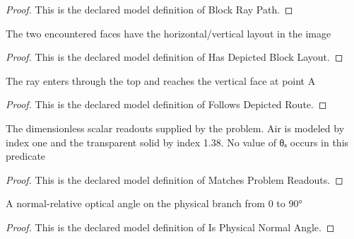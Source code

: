\begin{proof}
  This is the declared model definition of Block Ray Path.
\end{proof}
\begin{definition}
  \label{def:physics:phyx-mini-0096:phyxminiproblems-problemphyxmini0096-hasdepictedblocklayout}
  The two encountered faces have the horizontal/vertical layout in the image
\end{definition}
\begin{proof}
  This is the declared model definition of Has Depicted Block Layout.
\end{proof}
\begin{definition}
  \label{def:physics:phyx-mini-0096:phyxminiproblems-problemphyxmini0096-followsdepictedroute}
  The ray enters through the top and reaches the vertical face at point A
\end{definition}
\begin{proof}
  This is the declared model definition of Follows Depicted Route.
\end{proof}
\begin{definition}
  \label{def:physics:phyx-mini-0096:phyxminiproblems-problemphyxmini0096-matchesproblemreadouts}
  The dimensionless scalar readouts supplied by the problem. Air is modeled by index one and the transparent solid by index 1.38. No value of θₐ occurs in this predicate
\end{definition}
\begin{proof}
  This is the declared model definition of Matches Problem Readouts.
\end{proof}
\begin{definition}
  \label{def:physics:phyx-mini-0096:phyxminiproblems-problemphyxmini0096-isphysicalnormalangle}
  A normal-relative optical angle on the physical branch from 0 to 90°
\end{definition}
\begin{proof}
  This is the declared model definition of Is Physical Normal Angle.
\end{proof}
